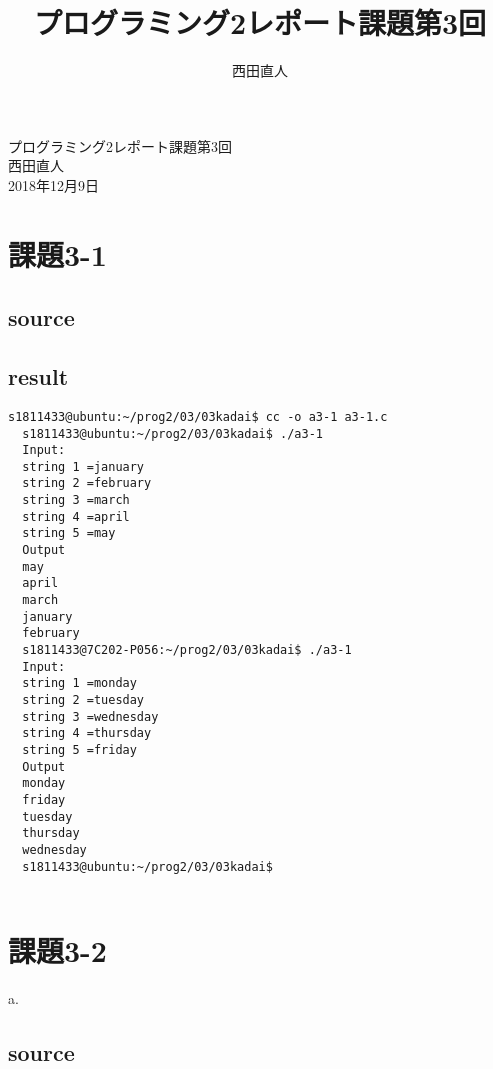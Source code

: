 \documentclass[10pt,a4paper]{jsarticle}
\title{プログラミング2レポート課題第3回}
\author{西田直人}
\begin{document}
\begin{center}
{\LARGE プログラミング2レポート課題第3回} \\
\large
西田直人 \\ 2018年12月9日
\end{center}
\normalsize
\section{課題3-1}

\subsection{source}


\subsection{result}

\begin{lstlisting}[basicstyle=\ttfamily\footnotesize,frame=single]
  s1811433@ubuntu:~/prog2/03/03kadai$ cc -o a3-1 a3-1.c
  s1811433@ubuntu:~/prog2/03/03kadai$ ./a3-1
  Input:
  string 1 =january
  string 2 =february
  string 3 =march
  string 4 =april
  string 5 =may
  Output
  may
  april
  march
  january
  february
  s1811433@7C202-P056:~/prog2/03/03kadai$ ./a3-1
  Input:
  string 1 =monday
  string 2 =tuesday
  string 3 =wednesday
  string 4 =thursday
  string 5 =friday
  Output
  monday
  friday
  tuesday
  thursday
  wednesday
  s1811433@ubuntu:~/prog2/03/03kadai$ 
   

\end{lstlisting}


\section{課題3-2}
a.
\subsection{source}

\end{document}
